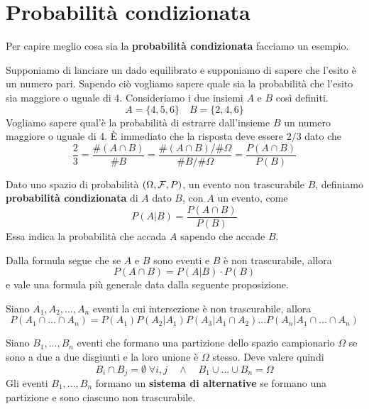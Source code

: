 \section{Probabilità condizionata}
Per capire meglio cosa sia la \textbf{probabilità condizionata} facciamo un esempio.

\begin{example}
	Supponiamo di lanciare un dado equilibrato e supponiamo di sapere che l'esito è un numero
	pari. Sapendo ciò vogliamo sapere quale sia la probabilità che l'esito sia maggiore o uguale
	di 4. Consideriamo i due insiemi $A$ e $B$ così definiti. 
	\[ A = \{ 4, 5, 6 \} \quad B = \{ 2, 4, 6 \} \]
	Vogliamo sapere qual'è la probabilità di estrarre dall'insieme $B$ un numero maggiore o uguale
	di 4. \`E immediato che la risposta deve essere $2/3$ dato che 
	\[
		\frac{2}{3} = \frac{\# (A \cap B)}{\# B} =
		\frac{\# (A \cap B) / \# \Omega}{\# B / \# \Omega} =
		\frac{P(A \cap B)}{P(B)}
	\]
\end{example}

\begin{definition}
	Dato uno spazio di probabilità $(\Omega, \mathcal{F}, P)$, un evento non trascurabile $B$, definiamo 
	\textbf{probabilità condizionata} di $A$ dato $B$, con $A$ un evento, come 
	\[ P(A | B) = \frac{P(A \cap B)}{P(B)} \]
	Essa indica la probabilità che accada $A$ sapendo che accade $B$.
\end{definition}

Dalla formula segue che se $A$ e $B$ sono eventi e $B$ è non trascurabile, allora 
\[ P(A \cap B) = P(A | B) \cdot P(B) \]
e vale una formula più generale data dalla seguente proposizione.

\begin{proposition}
	Siano $A_1, A_2, ..., A_n$ eventi la cui intersezione è non trascurabile, allora
	\[
		P(A_1 \cap  ... \cap A_n) = P(A_1) P(A_2 | A_1) P(A_3 | A_1 \cap A_2)
		... P(A_n | A_1 \cap ... \cap A_n)
	\]
\end{proposition}

\begin{definition}
	Siano $B_1, ..., B_n$ eventi che formano una partizione dello spazio campionario $\Omega$ se
	sono a due a due disgiunti e la loro unione è $\Omega$ stesso. Deve valere quindi 
	\[ B_i \cap B_j = \emptyset \; \forall i,j \quad \land \quad B_1 \cup ... \cup B_n = \Omega \]
	Gli eventi $B_1, ..., B_n$ formano un \textbf{sistema di alternative} se formano una 
	partizione e sono ciascuno non trascurabile.
\end{definition}

